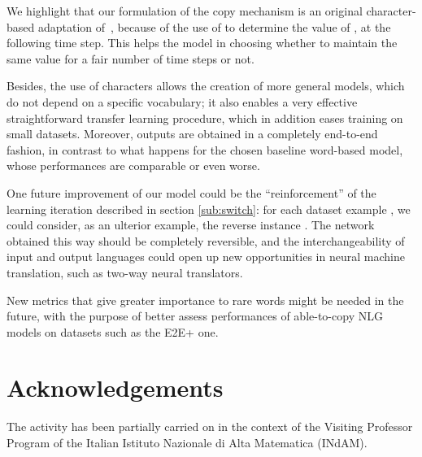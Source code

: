 \documentclass[runningheads, envcountsame, a4paper]{llncs}
\begin{document}
We highlight that our formulation of the copy mechanism is an original character-based adaptation of~\cite{See:17}, because of the use of  to determine the value of , at the following time step. This helps the model in choosing whether to maintain the same value for a fair number of time steps or not.

Besides, the use of characters allows the creation of more general models, which do not depend on a specific vocabulary; it also enables a very effective straightforward transfer learning procedure, which in addition eases training on small datasets. Moreover, outputs are obtained in a completely end-to-end fashion, in contrast to what happens for the chosen baseline word-based model, whose performances are comparable or even worse.

One future improvement of our model could be the ``reinforcement'' of the learning iteration described in section \ref{sub:switch}: for each dataset example , we could consider, as an ulterior example, the reverse instance . The network obtained this way should be completely reversible, and the interchangeability of input and output languages could open up new opportunities in neural machine translation, such as two-way neural translators.

New metrics that give greater importance to rare words might be needed in the future, with the purpose of better assess performances of able-to-copy NLG models on datasets such as the E2E+ one.

\section*{Acknowledgements}
The activity has been partially carried on in the context of the Visiting Professor Program of the Italian Istituto Nazionale di Alta Matematica (INdAM).
\end{document}
